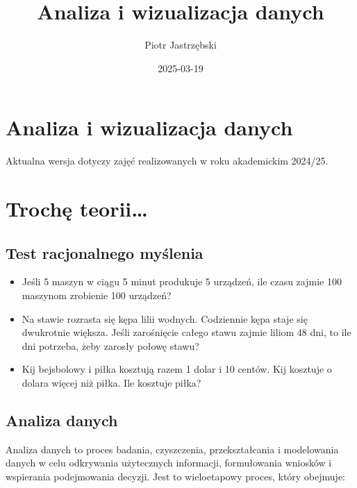 \documentclass[
  letterpaper,
  DIV=11,
  numbers=noendperiod]{scrreprt}
\title{Analiza i wizualizacja danych}
\author{Piotr Jastrzębski}
\date{2025-03-19}
\providecommand{\tightlist}{%
  \setlength{\itemsep}{0pt}\setlength{\parskip}{0pt}}\usepackage{longtable,booktabs,array}
\renewcommand*\contentsname{Spis treści}
\newcommand\contentsname{Spis treści}
\begin{document}
\maketitle

\renewcommand*\contentsname{Spis treści}
{
\hypersetup{linkcolor=}
\setcounter{tocdepth}{2}
\tableofcontents
}


\chapter{Analiza i wizualizacja
danych}\label{analiza-i-wizualizacja-danych}

Aktualna wersja dotyczy zajęć realizowanych w roku akademickim 2024/25.


\chapter{Trochę teorii\ldots{}}\label{trochux119-teorii}

\section{Test racjonalnego
myślenia}\label{test-racjonalnego-myux15blenia}

\begin{itemize}
\tightlist
\item
  Jeśli 5 maszyn w ciągu 5 minut produkuje 5 urządzeń, ile czasu zajmie
  100 maszynom zrobienie 100 urządzeń?
\item
  Na stawie rozrasta się kępa lilii wodnych. Codziennie kępa staje się
  dwukrotnie większa. Jeśli zarośnięcie całego stawu zajmie liliom 48
  dni, to ile dni potrzeba, żeby zarosły połowę stawu?
\item
  Kij bejsbolowy i piłka kosztują razem 1 dolar i 10 centów. Kij
  kosztuje o dolara więcej niż piłka. Ile kosztuje piłka?
\end{itemize}

\section{Analiza danych}\label{analiza-danych}

Analiza danych to proces badania, czyszczenia, przekształcania i
modelowania danych w celu odkrywania użytecznych informacji,
formułowania wniosków i wspierania podejmowania decyzji. Jest to
wieloetapowy proces, który obejmuje:
\end{document}
